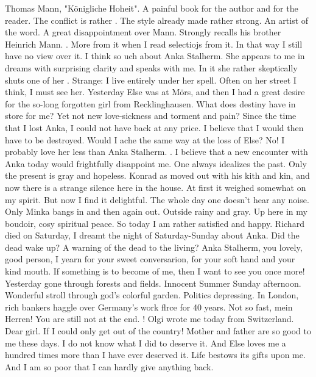
Thomas Mann, "Königliche Hoheit". A painful book for the author and for the reader. The conflict is rather . The style already made rather strong. An artist of the word. A great disappointment over Mann. Strongly recalls his brother Heinrich Mann. . More from it when I read selectiojs from it. In that way I still have no view over it. I think so uch about Anka Stalherm. She appears to me in dreams with surprising clarity and speaks with me. In it she rather skeptically shuts one of her . Strange: I live entirely under her spell. Often on her street I think, I must see her. Yesterday Else was at Mörs, and then I had a great desire for the so-long forgotten girl from Recklinghausen. What does destiny have in store for me? Yet not new love-sickness and torment and pain? Since the time that I lost Anka, I could not have back at any price. I believe that I would then have to be destroyed. Would I ache the same way at the loss of Else? No! I probably love her less than Anka Stalherm. . I believe that a new encounter with Anka today would frightfully disappoint me. One always idealizes the past. Only the present is gray and hopeless. Konrad 
as moved out with his kith and kin, and now there is a strange silence here in the house. At first it weighed somewhat on my spirit. But now I find it delightful. The whole day one doesn't hear any noise. Only Minka bangs in and then again out. Outside rainy and gray. Up here in my boudoir, cosy spiritual peace. So today I am rather satisfied and happy. Richard died on Saturday, I dreamt the night of Saturday-Sunday about Anka. Did the dead wake up? A warning of the dead to the living? Anka Stalherm, you lovely, good person, I yearn for your sweet conversarion, for your soft hand and your kind mouth. If something is to become of me, then I want to see you once more! Yesterday gone through forests and fields. Innocent Summer Sunday afternoon. Wonderful stroll through god's colorful garden. Politics depressing. In London, rich bankers haggle over Germany's work flrce for 40 years. Not so fast, mein Herren! You are still not at the end. ! Olgi wrote me today from Switzerland. Dear girl. If I could only get out of the country! Mother and father are so good to me these days. I do not know what I did to deserve it. And Else loves me a hundred times more than I have ever deserved it. Life bestows its gifts upon me. And I am so poor that I can hardly give anything back.
%
